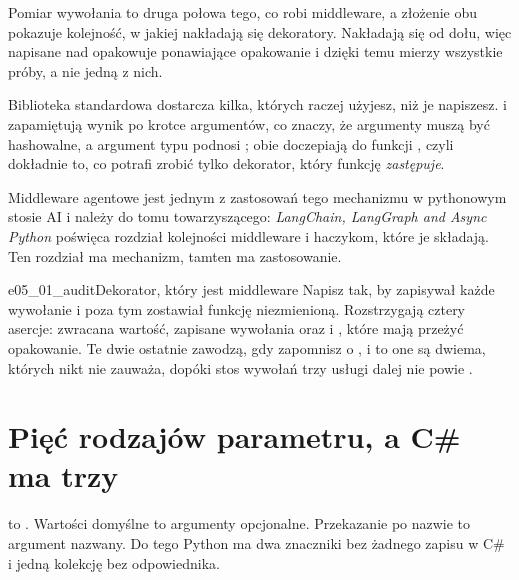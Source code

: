 \noindent
Pomiar wywołania to druga połowa tego, co robi middleware, a złożenie obu
pokazuje kolejność, w jakiej nakładają się dekoratory. Nakładają się od
dołu, więc  napisane nad  opakowuje ponawiające
opakowanie i dzięki temu mierzy wszystkie próby, a nie jedną z nich.



Biblioteka standardowa dostarcza kilka, których raczej użyjesz, niż je
napiszesz.  i  zapamiętują
wynik po krotce argumentów, co znaczy, że argumenty muszą być hashowalne, a
argument typu  podnosi ; obie doczepiają do
funkcji , czyli dokładnie to, co potrafi zrobić tylko
dekorator, który funkcję \emph{zastępuje}.

\begin{note}
Middleware agentowe jest jednym z zastosowań tego mechanizmu
w pythonowym stosie AI i należy do tomu towarzyszącego: \emph{LangChain,
LangGraph and Async Python} poświęca rozdział kolejności middleware i
haczykom, które je składają. Ten rozdział ma mechanizm, tamten ma
zastosowanie.
\end{note}

\begin{exercise}{e05_01_audit}{Dekorator, który jest middleware}
Napisz  tak, by zapisywał każde wywołanie i poza tym zostawiał
funkcję niezmienioną. Rozstrzygają cztery asercje: zwracana wartość,
zapisane wywołania oraz  i , które mają
przeżyć opakowanie. Te dwie ostatnie zawodzą, gdy zapomnisz o
, i to one są dwiema, których nikt nie zauważa, dopóki
stos wywołań trzy usługi dalej nie powie .
\end{exercise}

\section{Pięć rodzajów parametru, a C\# ma trzy}
\label{sec:ch05-parameters}

 to . Wartości domyślne to argumenty opcjonalne.
Przekazanie po nazwie to argument nazwany. Do tego Python ma dwa znaczniki
bez żadnego zapisu w C\# i jedną kolekcję bez odpowiednika.


